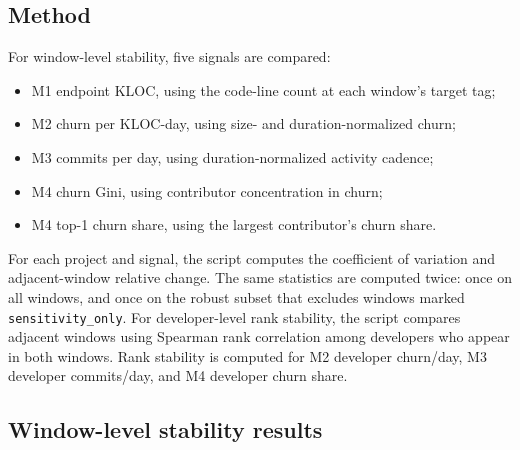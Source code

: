 \subsection{Method}
\label{sec:c1_method}

For window-level stability, five signals are compared:
\begin{itemize}[leftmargin=*]
  \item M1 endpoint KLOC, using the code-line count at each window's target tag;
  \item M2 churn per KLOC-day, using size- and duration-normalized churn;
  \item M3 commits per day, using duration-normalized activity cadence;
  \item M4 churn Gini, using contributor concentration in churn;
  \item M4 top-1 churn share, using the largest contributor's churn share.
\end{itemize}

For each project and signal, the script computes the coefficient of variation and adjacent-window relative
change. The same statistics are computed twice: once on all windows, and once on the robust subset that excludes
windows marked \texttt{sensitivity\_only}. For developer-level rank stability, the script compares adjacent
windows using Spearman rank correlation among developers who appear in both windows. Rank stability is computed
for M2 developer churn/day, M3 developer commits/day, and M4 developer churn share.

\subsection{Window-level stability results}
\label{sec:c1_window_results}

\begin{table}[H]
\centering
\scriptsize
\renewcommand{\arraystretch}{1.08}
\caption{C1 window-level volatility summary. CV is the coefficient of variation across project windows; ``primary'' excludes short windows marked \texttt{sensitivity\_only}.}
\label{tab:c1_window_stability_summary}
\end{table}

